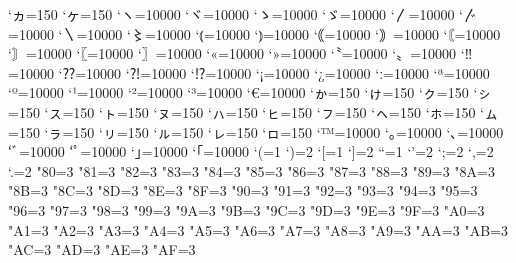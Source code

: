 \prebreakpenalty`ヵ=150%
\prebreakpenalty`ヶ=150%
\prebreakpenalty`ヽ=10000
\prebreakpenalty`ヾ=10000
\prebreakpenalty`ゝ=10000
\prebreakpenalty`ゞ=10000
\prebreakpenalty`〳=10000
\prebreakpenalty`〴=10000
\prebreakpenalty`〵=10000
\prebreakpenalty`〻=10000
\postbreakpenalty`⦅=10000
\prebreakpenalty`⦆=10000
\postbreakpenalty`｟=10000
\prebreakpenalty`｠=10000
\postbreakpenalty`〘=10000
\prebreakpenalty`〙=10000
\postbreakpenalty`〖=10000
\prebreakpenalty`〗=10000
\postbreakpenalty`«=10000
\prebreakpenalty`»=10000
\postbreakpenalty`〝=10000
\prebreakpenalty`〟=10000
\prebreakpenalty`‼=10000
\prebreakpenalty`⁇=10000
\prebreakpenalty`⁈=10000
\prebreakpenalty`⁉=10000
\postbreakpenalty`¡=10000
\postbreakpenalty`¿=10000
\prebreakpenalty`ː=10000
\prebreakpenalty`ª=10000
\prebreakpenalty`º=10000
\prebreakpenalty`¹=10000
\prebreakpenalty`²=10000
\prebreakpenalty`³=10000
\postbreakpenalty`€=10000
\prebreakpenalty`ゕ=150
\prebreakpenalty`ゖ=150
\prebreakpenalty`ㇰ=150
\prebreakpenalty`ㇱ=150
\prebreakpenalty`ㇲ=150
\prebreakpenalty`ㇳ=150
\prebreakpenalty`ㇴ=150
\prebreakpenalty`ㇵ=150
\prebreakpenalty`ㇶ=150
\prebreakpenalty`ㇷ=150
\prebreakpenalty`ㇸ=150
\prebreakpenalty`ㇹ=150
\prebreakpenalty`ㇺ=150
\prebreakpenalty`ㇻ=150
\prebreakpenalty`ㇼ=150
\prebreakpenalty`ㇽ=150
\prebreakpenalty`ㇾ=150
\prebreakpenalty`ㇿ=150
\prebreakpenalty`™=10000
\prebreakpenalty`｡=10000
\prebreakpenalty`､=10000
\prebreakpenalty`ﾞ=10000
\prebreakpenalty`ﾟ=10000
\prebreakpenalty`｣=10000
\postbreakpenalty`｢=10000
\xspcode`(=1
\xspcode`)=2
\xspcode`[=1
\xspcode`]=2
\xspcode``=1
\xspcode`'=2
\xspcode`;=2
\xspcode`,=2
\xspcode`.=2
\xspcode"80=3
\xspcode"81=3
\xspcode"82=3
\xspcode"83=3
\xspcode"84=3
\xspcode"85=3
\xspcode"86=3
\xspcode"87=3
\xspcode"88=3
\xspcode"89=3
\xspcode"8A=3
\xspcode"8B=3
\xspcode"8C=3
\xspcode"8D=3
\xspcode"8E=3
\xspcode"8F=3
\xspcode"90=3
\xspcode"91=3
\xspcode"92=3
\xspcode"93=3
\xspcode"94=3
\xspcode"95=3
\xspcode"96=3
\xspcode"97=3
\xspcode"98=3
\xspcode"99=3
\xspcode"9A=3
\xspcode"9B=3
\xspcode"9C=3
\xspcode"9D=3
\xspcode"9E=3
\xspcode"9F=3
\xspcode"A0=3
\xspcode"A1=3
\xspcode"A2=3
\xspcode"A3=3
\xspcode"A4=3
\xspcode"A5=3
\xspcode"A6=3
\xspcode"A7=3
\xspcode"A8=3
\xspcode"A9=3
\xspcode"AA=3
\xspcode"AB=3
\xspcode"AC=3
\xspcode"AD=3
\xspcode"AE=3
\xspcode"AF=3
